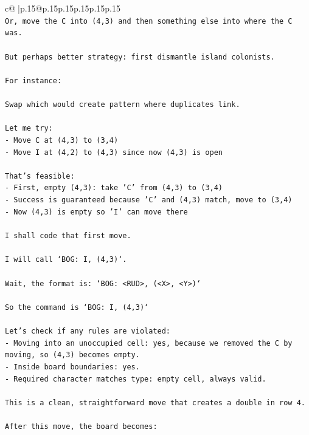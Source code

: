 \documentclass{article}
\begin{document}
{\begin{supertabular}{c@{$\;$}|p{.15\linewidth}@{}p{.15\linewidth}p{.15\linewidth}p{.15\linewidth}p{.15\linewidth}p{.15\linewidth}}
{{{\\ 
\texttt{Or, move the C into (4,3) and then something else into where the C was.} \\
\\ 
\texttt{But perhaps better strategy: first dismantle island colonists.} \\
\\ 
\texttt{For instance:} \\
\\ 
\texttt{Swap which would create pattern where duplicates link.} \\
\\ 
\texttt{Let me try:} \\
\texttt{{-} Move C at (4,3) to (3,4)} \\
\texttt{{-} Move I at (4,2) to (4,3) since now (4,3) is open} \\
\\ 
\texttt{That's feasible:} \\
\texttt{{-} First, empty (4,3): take 'C' from (4,3) to (3,4)} \\
\texttt{{-} Success is guaranteed because 'C' and (4,3) match, move to (3,4)} \\
\texttt{{-} Now (4,3) is empty so 'I' can move there} \\
\\ 
\texttt{I shall code that first move.} \\
\\ 
\texttt{I will call `BOG: I, (4,3)`.} \\
\\ 
\texttt{Wait, the format is: `BOG: <RUD>, (<X>, <Y>)`} \\
\\ 
\texttt{So the command is `BOG: I, (4,3)`} \\
\\ 
\texttt{Let's check if any rules are violated:} \\
\texttt{{-} Moving into an unoccupied cell: yes, because we removed the C by moving, so (4,3) becomes empty.} \\
\texttt{{-} Inside board boundaries: yes.} \\
\texttt{{-} Required character matches type: empty cell, always valid.} \\
\\ 
\texttt{This is a clean, straightforward move that creates a double in row 4.} \\
\\ 
\texttt{After this move, the board becomes:} \\
}}}
\end{supertabular}}
\end{document}
